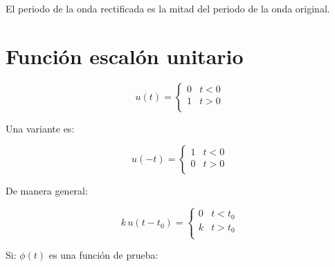 \begin{figure}[H]
    \centering
    
\end{figure}

El periodo de la onda rectificada es la mitad del periodo de la onda original.

\section{Función escalón unitario}

\begin{equation*}
    u(t)=\begin{cases}
        0 & t<0\\
        1 & t>0\\
    \end{cases}
\end{equation*}

\begin{figure}[H]
    \centering
    
\end{figure}

Una variante es:

\begin{equation*}
    u(-t)=\begin{cases}
        1 & t<0\\
        0 & t>0\\
    \end{cases}
\end{equation*}

\begin{figure}[H]
    \centering
    
\end{figure}

De manera general:

\begin{equation*}
    k\,u(t-t_0)=\begin{cases}
        0 & t<t_0\\
        k & t>t_0\\
    \end{cases}
\end{equation*}

\begin{figure}[H]
    \centering
    
\end{figure}

Si: $\phi(t)$ es una función de prueba:

\begin{figure}[H]
    \centering
    
\end{figure}

